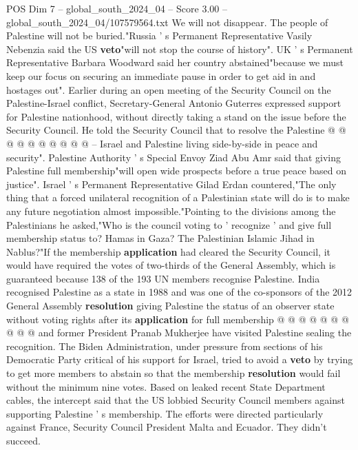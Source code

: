 \begin{textsample}{POS Dim 7 – global\_south\_2024\_04 – Score 3.00 – global\_south\_2024\_04/107579564.txt}
We will not disappear.
The people of Palestine will not be buried."Russia ' s Permanent Representative Vasily Nebenzia said the US \textbf{veto}"will not stop the course of history".
UK ' s Permanent Representative Barbara Woodward said her country abstained"because we must keep our focus on securing an immediate pause in order to get aid in and hostages out".
Earlier during an open meeting of the Security Council on the Palestine-Israel conflict, Secretary-General Antonio Guterres expressed support for Palestine nationhood, without directly taking a stand on the issue before the Security Council.
He told the Security Council that to resolve the Palestine @ @ @ @ @ @ @ @ @ @ -- Israel and Palestine living side-by-side in peace and security".
Palestine Authority ' s Special Envoy Ziad Abu Amr said that giving Palestine full membership"will open wide prospects before a true peace based on justice".
Israel ' s Permanent Representative Gilad Erdan countered,"The only thing that a forced unilateral recognition of a Palestinian state will do is to make any future negotiation almost impossible."Pointing to the divisions among the Palestinians he asked,"Who is the council voting to ' recognize ' and give full membership status to?
Hamas in Gaza?
The Palestinian Islamic Jihad in Nablus?"If the membership \textbf{application} had cleared the Security Council, it would have required the votes of two-thirds of the General Assembly, which is guaranteed because 138 of the 193 UN members recognise Palestine.
India recognised Palestine as a state in 1988 and was one of the co-sponsors of the 2012 General Assembly \textbf{resolution} giving Palestine the status of an observer state without voting rights after its \textbf{application} for full membership @ @ @ @ @ @ @ @ @ @ and former President Pranab Mukherjee have visited Palestine sealing the recognition.
The Biden Administration, under pressure from sections of his Democratic Party critical of his support for Israel, tried to avoid a \textbf{veto} by trying to get more members to abstain so that the membership \textbf{resolution} would fail without the minimum nine votes.
Based on leaked recent State Department cables, the intercept said that the US lobbied Security Council members against supporting Palestine ' s membership.
The efforts were directed particularly against France, Security Council President Malta and Ecuador.
They didn't succeed.

\end{textsample}
